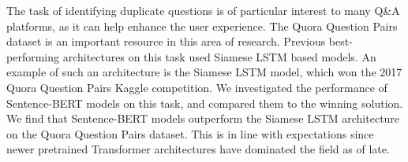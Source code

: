 \documentclass[10pt, a4paper]{article}
\begin{document}
The task of identifying duplicate questions is of particular interest to many Q\&A platforms, as it can help enhance the user experience.
The Quora Question Pairs dataset is an important resource in this area of research. Previous best-performing architectures on this task used Siamese LSTM based models.
An example of such an architecture is the Siamese LSTM model, which won the 2017 Quora Question Pairs Kaggle competition.
We investigated the performance of Sentence-BERT models on this task, and compared them to the winning solution.
We find that Sentence-BERT models outperform the Siamese LSTM architecture on the Quora Question Pairs dataset.
This is in line with expectations since newer pretrained Transformer architectures have dominated the field as of late.



\end{document}
